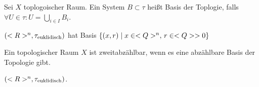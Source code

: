 \begin{definition}
	Sei $X$ toplogoischer Raum. Ein System $B\subset\tau$ heißt Basis der Toplogie, falls $\forall U\in\tau: U=\bigcup_{i\in I} B_i$.
\end{definition}

\begin{example}
	$(<R>^n,\tau_{\text{euklidisch}})$ hat Basis $\{ (x,r)\mid x\in<Q>^n,\,r\in<Q> > 0\}$
\end{example}

\begin{definition}
	Ein topologischer Raum $X$ ist zweitabzählbar, wenn es eine abzählbare Basis der Topologie gibt.
\end{definition}

\begin{example}
	$(<R>^n,\tau_\text{euklidisch})$.
\end{example}